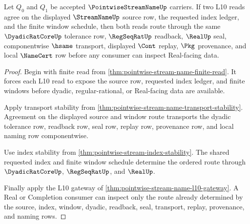 \begin{theorem}
\label{thm:pointwise-stream-name-l10-index-determinacy}
Let $Q_0$ and $Q_1$ be accepted $\PointwiseStreamNameUp$ carriers. If two L10 reads agree on the displayed $\StreamNameUp$ source row, the requested index ledger, and the finite window schedule, then both reads route through the same $\DyadicRatCoreUp$ tolerance row, $\RegSeqRatUp$ readback, $\RealUp$ seal, componentwise $\hsame$ transport, displayed $\Cont$ replay, $\Pkg$ provenance, and local $\NameCert$ row before any consumer can inspect Real-facing data.
\end{theorem}
\begin{proof}
Begin with finite read from \autoref{thm:pointwise-stream-name-finite-read}. It forces each L10 read to expose the source row, requested index ledger, and finite windows before dyadic, regular-rational, or Real-facing data are available.

Apply transport stability from \autoref{thm:pointwise-stream-name-transport-stability}. Agreement on the displayed source and window route transports the dyadic tolerance row, readback row, seal row, replay row, provenance row, and local naming row componentwise.

Use index stability from \autoref{thm:pointwise-stream-index-stability}. The shared requested index and finite window schedule determine the ordered route through $\DyadicRatCoreUp$, $\RegSeqRatUp$, and $\RealUp$.

Finally apply the L10 gateway of \autoref{thm:pointwise-stream-name-l10-gateway}. A Real or Completion consumer can inspect only the route already determined by the source, index, window, dyadic, readback, seal, transport, replay, provenance, and naming rows.
\end{proof}

